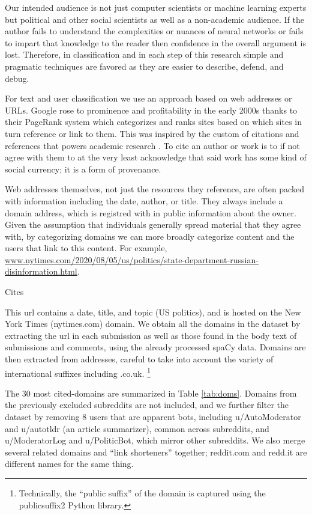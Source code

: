 Our intended audience is not just computer scientists or machine learning experts but political and other social scientists as well as a non-academic audience.
If the author fails to understand the complexities or nuances of neural networks or fails to impart that knowledge to the reader then confidence in the overall argument is lost.
Therefore, in classification and in each step of this research simple and pragmatic techniques are favored as they are easier to describe, defend, and debug.

For text and user classification we use an approach based on web addresses or URLs.
Google rose to prominence and profitability in the early 2000s thanks to their PageRank system which categorizes and ranks sites based on which sites in turn reference or link to them.
This was inspired by the custom of citations and references that powers academic research \cite[p. 462]{isaacson2014}.
To cite an author or work is to if not agree with them to at the very least acknowledge that said work has some kind of social currency; it is a form of provenance.

Web addresses themselves, not just the resources they reference, are often packed with information including the date, author, or title.
They always include a domain address, which is registred with in public information about the owner.
Given the assumption that individuals generally spread material that they agree with, by categorizing domains we can more broadly categorize content and the users that link to this content.
For example, \url{www.nytimes.com/2020/08/05/us/politics/state-department-russian-disinformation.html}.

\begin{table}[!ht]
\centering
\caption{Cites}

\label{tab:doms}
\end{table}

This url contains a date, title, and topic (US politics), and is hosted on the New York Times (nytimes.com) domain.
We obtain all the domains in the dataset by extracting the url in each submission as well as those found in the body text of submissions and comments, using the already processed spaCy data.
Domains are then extracted from addresses, careful to take into account the variety of international suffixes including .co.uk. \footnote{Technically, the ``public suffix'' of the domain is captured using the publicsuffix2 Python library.}

The 30 most cited-domains are summarized in Table \ref{tab:doms}.
Domains from the previously excluded subreddits are not included, and we further filter the dataset by removing 8 users that are apparent bots, including u/AutoModerator and u/autotldr (an article summarizer), common across subreddits, and u/ModeratorLog and u/PoliticBot, which mirror other subreddits.
We also merge several related domains and ``link shorteners'' together; reddit.com and redd.it are different names for the same thing.

